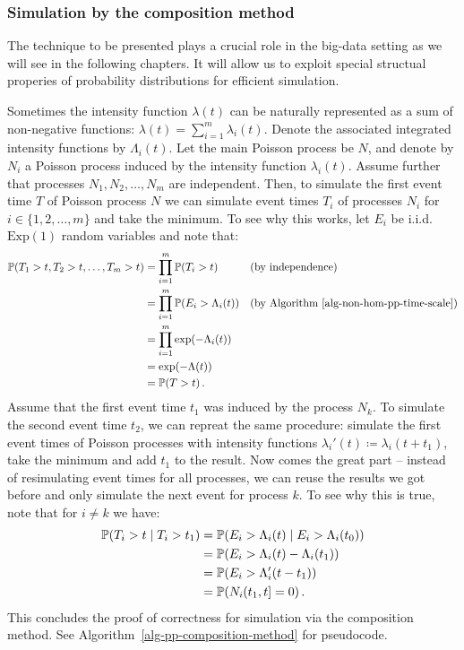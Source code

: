 \documentclass[report.tex]{subfiles}
\begin{document}
\subsubsection{Simulation by the composition method}

The technique to be presented plays a crucial role in the big-data
setting as we will see in the following chapters.
It will allow us to exploit special structual properies of probability distributions
for efficient simulation.

Sometimes the intensity function $\lambda(t)$ can be naturally represented
as a sum of non-negative functions: $\lambda(t) = \sum_{i=1}^{m} \lambda_{i}(t)$.
Denote the associated integrated intensity functions by $\Lambda_{i}(t)$.
Let the main Poisson process be $N$, and denote by $N_{i}$ a Poisson process induced
by the intensity function $\lambda_{i}(t)$. Assume further that processes
$N_{1}, N_{2}, \dots, N_{m}$ are independent.
Then, to simulate the first event time $T$ of Poisson process $N$ we can simulate event times
$T_{i}$ of processes $N_{i}$ for $i \in \{1, 2, \dots, m\}$ and take
the minimum.
To see why this works, let $E_{i}$ be i.i.d. $\text{Exp}(1)$ random variables and
note that:
\begin{align*}
  \mathbb{P}\!\left({T_{1} > t, T_{2} > t, \dots, T_{m} > t}\right)
  &= \prod_{i=1}^{m} \mathbb{P}\!\left({T_{i} > t}\right) && \text{(by independence)} \\
  &= \prod_{i=1}^{m} \mathbb{P}\!\left({E_{i} > \Lambda_{i}(t)}\right) && \text{(by Algorithm~\ref{alg-non-hom-pp-time-scale})} \\
  &= \prod_{i=1}^{m} \exp(-\Lambda_{i}(t)) \\
  &= \exp(-\Lambda(t)) \\
  &= \mathbb{P}\!\left({T > t}\right).
\end{align*}
Assume that the first event time $t_{1}$ was induced
by the process $N_{k}$.
To simulate the second event time $t_{2}$, we can repreat the same procedure:
simulate the first event times of Poisson processes with intensity
functions \mbox{$\lambda_{i}'(t) \coloneqq \lambda_{i}(t + t_{1})$},
take the minimum and add $t_{1}$ to the result.
Now comes the great part -- instead of resimulating event times for all
processes, we can reuse the results we got before and only simulate the next
event for process $k$.
To see why this is true, note that for $i \neq k$ we have:
\begin{align*}
\mathbb{P}\!\left({T_{i} > t} \mid {T_{i} > t_{1}}\right)
&= \mathbb{P}\!\left({E_{i} > \Lambda_{i}(t)} \mid {E_{i} > \Lambda_{i}(t_{0})}\right) \\
&= \mathbb{P}\!\left({E_{i} > \Lambda_{i}(t) - \Lambda_{i}(t_{1})}\right) \\
&= \mathbb{P}\!\left({E_{i} > \Lambda_{i}'(t - t_{1})}\right) \\
&= \mathbb{P}\!\left({{N_{i\,}}\!({t_{1}},{t}] = 0}\right).
\end{align*}
This concludes the proof of correctness for simulation via the composition method.
See Algorithm~\ref{alg-pp-composition-method} for pseudocode.
\end{document}
